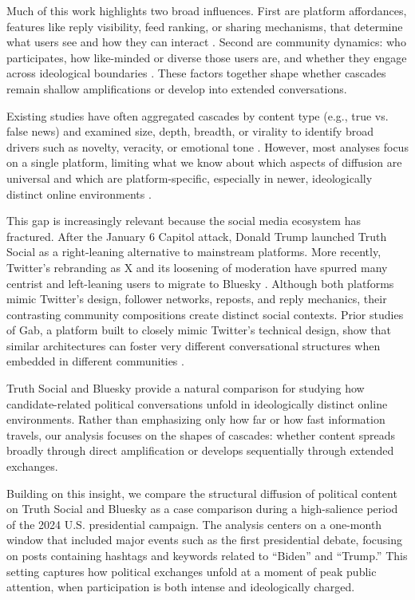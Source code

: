 \documentclass[letterpaper]{article} %
\begin{document}
Much of this work highlights two broad influences. First are platform affordances, features like reply visibility, feed ranking, or sharing mechanisms, that determine what users see and how they can interact \cite{boyd_social_2010, treem_social_2013}. Second are community dynamics: who participates, how like-minded or diverse those users are, and whether they engage across ideological boundaries \cite{conover_political_2011, garimella_political_2018}. These factors together shape whether cascades remain shallow amplifications or develop into extended conversations.

Existing studies have often aggregated cascades by content type (e.g., true vs. false news) and examined size, depth, breadth, or virality to identify broad drivers such as novelty, veracity, or emotional tone \cite{goel_structural_2016, vosoughi_spread_2018, berger_what_2012, zollo_emotional_2015}. However, most analyses focus on a single platform, limiting what we know about which aspects of diffusion are universal and which are platform-specific, especially in newer, ideologically distinct online environments \cite{cinelli_echo_2021}.

This gap is increasingly relevant because the social media ecosystem has fractured. After the January 6 Capitol attack, Donald Trump launched Truth Social as a right-leaning alternative to mainstream platforms. More recently, Twitter’s rebranding as X and its loosening of moderation have spurred many centrist and left-leaning users to migrate to Bluesky \cite{gerard_truth_2023, failla_im_2024, quelle_bluesky_2024}. Although both platforms mimic Twitter’s design, follower networks, reposts, and reply mechanics, their contrasting community compositions create distinct social contexts. Prior studies of Gab, a platform built to closely mimic Twitter’s technical design, show that similar architectures can foster very different conversational structures when embedded in different communities \cite{cinelli_echo_2021}.

Truth Social and Bluesky provide a natural comparison for studying how candidate-related political conversations unfold in ideologically distinct online environments. Rather than emphasizing only how far or how fast information travels, our analysis focuses on the shapes of cascades: whether content spreads broadly through direct amplification or develops sequentially through extended exchanges.

Building on this insight, we compare the structural diffusion of political content on Truth Social and Bluesky as a case comparison during a high-salience period of the 2024 U.S. presidential campaign. The analysis centers on a one-month window that included major events such as the first presidential debate, focusing on posts containing hashtags and keywords related to “Biden” and “Trump.” This setting captures how political exchanges unfold at a moment of peak public attention, when participation is both intense and ideologically charged. 
\end{document}
